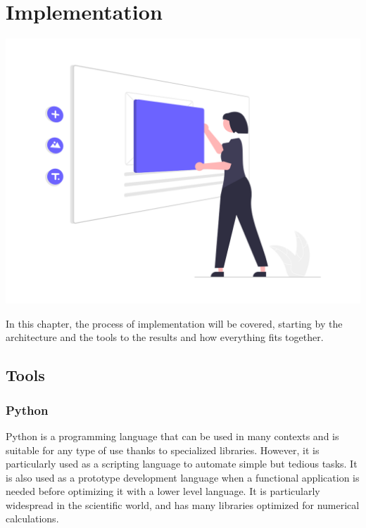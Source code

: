 
\chapter{Implementation}
\renewcommand{\thesection}{\arabic{section}}
		




\label{chapitre5}
		
		\includegraphics [width=1 \linewidth, height=0.8\textheight, keepaspectratio] {images/chaptersFigures/implementation.png}
		
	
		
    \newpage
    \thispagestyle{plain}
In this chapter, the process of implementation will be covered, starting by the architecture and the tools to the results and how everything fits together.

\section{Tools}
\label{sec:tool}
\subsection{Python}
\label{sec:python}
Python\cite{WelcomePythonOrg} is a programming language that can be used in many contexts and is suitable for any type of use thanks to specialized libraries. However, it is particularly used as a scripting language to automate simple but tedious tasks. It is also used as a prototype development language when a functional application is needed before optimizing it with a lower level language. It is particularly widespread in the scientific world, and has many libraries optimized for numerical calculations\cite{PythonLangageWikipedia}.
